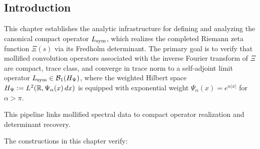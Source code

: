 \subsection*{Introduction}

This chapter establishes the analytic infrastructure for defining and analyzing the canonical compact operator \( L_{\mathrm{sym}} \), which realizes the completed Riemann zeta function \( \Xi(s) \) via its Fredholm determinant. The primary goal is to verify that mollified convolution operators associated with the inverse Fourier transform of \( \Xi \) are compact, trace class, and converge in trace norm to a self-adjoint limit operator \( L_{\mathrm{sym}} \in \mathcal{B}_1(H_{\Psi}) \), where the weighted Hilbert space \( H_{\Psi} := L^2(\mathbb{R}, \Psi_\alpha(x) \, dx) \) is equipped with exponential weight \( \Psi_\alpha(x) = e^{\alpha|x|} \) for \( \alpha > \pi \).

\begin{center}
\end{center}

\noindent
This pipeline links mollified spectral data to compact operator realization and determinant recovery.

\medskip

The constructions in this chapter verify:

